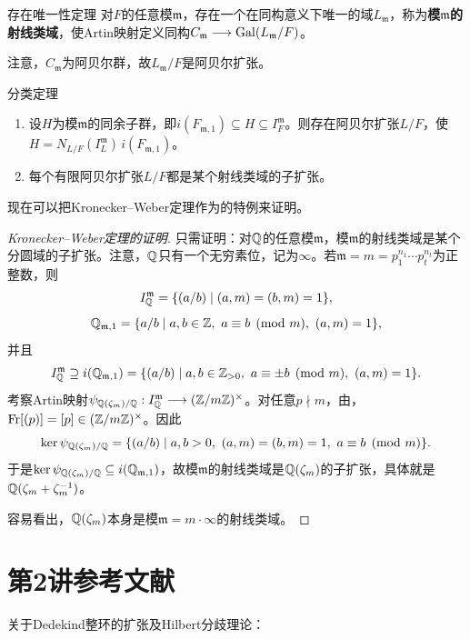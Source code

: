 \begin{theorem}{存在唯一性定理}\label{L2S3O9}
对$F$的任意模$\mathfrak{m}$，存在一个在同构意义下唯一的域$L_{\mathfrak{m}}$，称为\textbf{模$\mathfrak{m}$的射线类域}，使Artin映射定义同构$C_{\mathfrak{m}}\longrightarrow\operatorname{Gal}(L_{\mathfrak{m}}/F)$。
\end{theorem}
注意，$C_{\mathfrak{m}}$为阿贝尔群，故$L_{\mathfrak{m}}/F$是阿贝尔扩张。
\begin{corollary}{分类定理}\label{L2S3O10}
\begin{enumerate}
\item 设$H$为模$\mathfrak{m}$的同余子群，即$i(F_{\mathfrak{m},1})\subseteq H\subseteq I_F^{\mathfrak{m}}$。则存在阿贝尔扩张$L/F$，使$H=N_{L/F}(I_L^{\mathfrak{m}})\,i(F_{\mathfrak{m},1})$。
\item 每个有限阿贝尔扩张$L/F$都是某个射线类域的子扩张。
\end{enumerate}
\end{corollary}
现在可以把Kronecker--Weber定理作为的特例来证明。
\begin{proof}[Kronecker--Weber定理的证明]
只需证明：对$\mathbb{Q}$的任意模$\mathfrak{m}$，模$\mathfrak{m}$的射线类域是某个分圆域的子扩张。注意，$\mathbb{Q}$只有一个无穷素位，记为$\infty$。若$\mathfrak{m}=m=p_1^{n_1}\cdots p_t^{n_t}$为正整数，则
\[I_{\mathbb{Q}}^{\mathfrak{m}}=\{(a/b)\mid(a,m)=(b,m)=1\},\]
\[\Q_{\mathfrak{m},1}=\{a/b\mid a,b\in\Z,\ a\equiv b\pmod m,\ (a,m)=1\},\]
并且
\[I_{\mathbb{Q}}^{\mathfrak{m}}\supseteq i(\mathbb{Q}_{\mathfrak{m},1})=\{(a/b)\mid a,b\in\mathbb{Z}_{>0},\ a\equiv\pm b\pmod m,\ (a,m)=1\}.\]
考察Artin映射$\psi_{\mathbb{Q}(\zeta_m)/\mathbb{Q}}:I_{\mathbb{Q}}^{\mathfrak{m}}\longrightarrow(\mathbb{Z}/m\mathbb{Z})^\times$。对任意$p\nmid m$，由，$\operatorname{Fr}[(p)]=[p]\in(\mathbb{Z}/m\mathbb{Z})^\times$。因此
\[\ker\psi_{\mathbb{Q}(\zeta_m)/\mathbb{Q}}=\{(a/b)\mid a,b>0,\ (a,m)=(b,m)=1,\ a\equiv b\pmod m\}.\]
于是$\ker\psi_{\mathbb{Q}(\zeta_m)/\mathbb{Q}}\subseteq i(\mathbb{Q}_{\mathfrak{m},1})$，故模$\mathfrak{m}$的射线类域是$\mathbb{Q}(\zeta_m)$的子扩张，具体就是$\mathbb{Q}(\zeta_m+\zeta_m^{-1})$。

容易看出，$\mathbb{Q}(\zeta_m)$本身是模$\mathfrak{m}=m\cdot\infty$的射线类域。
\end{proof}
\section{第2讲参考文献}\label{L2S4}
关于Dedekind整环的扩张及Hilbert分歧理论：
